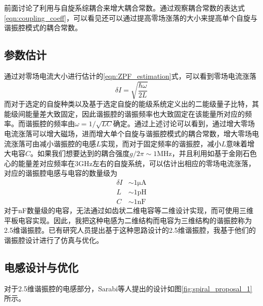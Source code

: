             前面讨论了利用与自旋系综耦合来增大耦合常数。通过观察耦合常数的表达式\ref{eqn:coupling_coeff}，可以看见还可以通过提高零场涨落的大小来提高单个自旋与谐振腔模式的耦合常数。


            \subsection{参数估计} %
            \label{sub:参数估计}

                通过对零场电流大小进行估计的\ref{eqn:ZPF_estimation}式，可以看到零场电流涨落
                \begin{equation}
                    \delta I = \sqrt{ \frac{\hbar \omega}{2 L} }
                \end{equation}
                而对于选定的自旋种类以及基于选定自旋的能级系统定义出的二能级量子比特，其能级间能量差大致固定，因此谐振腔的谐振频率也大致固定在该能量所对应的频率。而谐振腔的频率由$ \omega = 1/\sqrt{LC} $确定。通过上述讨论可以看到，通过增大零场电流涨落可以增大磁场，进而增大单个自旋与谐振腔模式的耦合常数，增大零场电流涨落可由减小谐振腔的电感$L$实现，而对于固定频率的谐振腔，减小$L$意味着增大电容$C$。如果我们想要达到的耦合强度$ g/2 \pi \sim 1 \mathrm{MHz} $，并且利用如基于金刚石色心的能量差对应频率在$3 \mathrm{GHz} $左右的自旋系统，可以估计出相应的零场电流涨落，对应的谐振腔电感与电容的数量级为
                \begin{align}
                    \delta I & \sim  1 \mathrm{\mu A}\\
                    L & \sim  1 \mathrm{pH}\\
                    C & \sim  1 \mathrm{nF}
                \end{align}
                对于nF数量级的电容，无法通过如齿状二维电容等二维设计实现，而可使用三维平板电容实现。因此，我把这种电感为二维结构而电容为三维结构的谐振腔称为2.5维谐振腔。已有研究人员提出基于这种思路设计的2.5维谐振腔\cite{sarabi2017prospective}，我基于他们的谐振腔设计进行了仿真与优化。
                

                
            \subsection{电感设计与优化} %
            \label{sub:电感设计与优化}

                对于2.5维谐振腔的电感部分，Sarabi等人提出的设计如图\ref{fig:spiral_proposal_1}所示。


